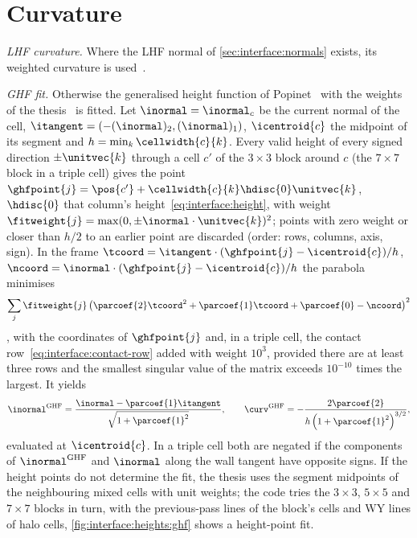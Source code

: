 \section{Curvature}\label{sec:interface:curvature}
\emph{LHF curvature.} Where the LHF normal of \cref{sec:interface:normals}
exists, its weighted curvature is used~.

\emph{GHF fit.} Otherwise the generalised height function of
Popinet~\cite{popinet2009} with the weights of the thesis~ is
fitted. Let $\inormal=\inormal_c$ be the current normal of the cell,
$\itangent=(-(\inormal)_2,(\inormal)_1)$, $\icentroid{c}$ the midpoint of its
segment and $h=\min_k\cellwidth{c}{k}$. Every valid height of every signed
direction $\pm\unitvec{k}$ through a cell $c'$ of the $3\times3$ block around
$c$ (the $7\times7$ block in a triple cell) gives the point $\ghfpoint{j}=\pos{c'}+\cellwidth{c}{k}\hdisc{0}\unitvec{k}$,
$\hdisc{0}$ that column's height~\cref{eq:interface:height}, with weight $\fitweight{j}=\max(0,\pm\inormal\cdot\unitvec{k})^2$; points
with zero weight or closer than $h/2$ to an earlier point are discarded (order:
rows, columns, axis, sign). In the frame
$\tcoord=\itangent\cdot(\ghfpoint{j}-\icentroid{c})/h$,
$\ncoord=\inormal\cdot(\ghfpoint{j}-\icentroid{c})/h$ the parabola minimises
\begin{equation}\label{eq:interface:ghf}
  \sum_j\fitweight{j}\roundpar{\parcoef{2}\tcoord^2+\parcoef{1}\tcoord+\parcoef{0}-\ncoord}^2
\end{equation}
, with the coordinates of $\ghfpoint{j}$ and, in a triple
cell, the contact row~\cref{eq:interface:contact-row} added with weight $10^3$,
provided there are at least three rows and the smallest
singular value of the matrix exceeds $10^{-10}$ times the largest. It yields
\begin{equation}\label{eq:interface:ghf-result}
  \inormal^{\mathrm{GHF}}=\frac{\inormal-\parcoef{1}\itangent}{\sqrt{1+\parcoef{1}^2}},\qquad
  \curv^{\mathrm{GHF}}=-\frac{2\parcoef{2}}{h\roundpar{1+\parcoef{1}^2}^{3/2}},
\end{equation}
evaluated at $\icentroid{c}$. In a triple cell both are negated if the
components of $\inormal^{\mathrm{GHF}}$ and $\inormal$ along the wall tangent
have opposite signs. If the height points do not determine the fit, the thesis
uses the segment midpoints of the neighbouring mixed cells with unit weights;
the code tries the $3\times3$, $5\times5$ and $7\times7$ blocks in turn, with
the previous-pass lines of the block's cells and WY lines of halo cells,
\cref{fig:interface:heights:ghf} shows a height-point fit.

